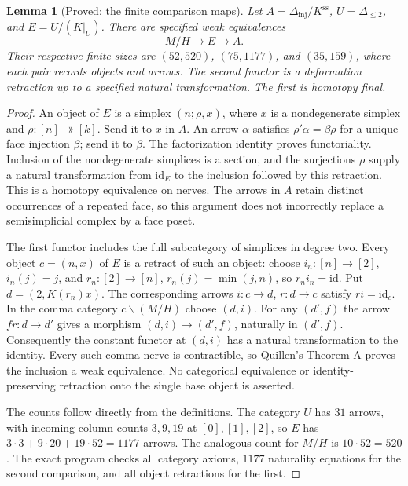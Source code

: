 \documentclass[11pt,a4paper]{article}
\newtheorem{lemma}[theorem]{Lemma}
\theoremstyle{definition}
\theoremstyle{remark}
\newcommand{\id}{\mathrm{id}}
\begin{document}
\begin{lemma}[Proved: the finite comparison maps]\label{A:comparisons}
Let $A=\Delta_{\mathrm{inj}}/K^{\mathrm{ss}}$, $U=\Delta_{\leq2}$, and $E=U/(K|_U)$. There are specified weak equivalences
\[
 M/H\longrightarrow E\longrightarrow A.
\]
Their respective finite sizes are $(52,520)$, $(75,1177)$, and $(35,159)$, where each pair records objects and arrows. The second functor is a deformation retraction up to a specified natural transformation. The first is homotopy final.
\end{lemma}
\begin{proof}
An object of $E$ is a simplex $(n;\rho,x)$, where $x$ is a nondegenerate simplex and $\rho:[n]\twoheadrightarrow[k]$. Send it to $x$ in $A$. An arrow $\alpha$ satisfies $\rho'\alpha=\beta\rho$ for a unique face injection $\beta$; send it to $\beta$. The factorization identity proves functoriality. Inclusion of the nondegenerate simplices is a section, and the surjections $\rho$ supply a natural transformation from $\id_E$ to the inclusion followed by this retraction. This is a homotopy equivalence on nerves. The arrows in $A$ retain distinct occurrences of a repeated face, so this argument does not incorrectly replace a semisimplicial complex by a face poset.

The first functor includes the full subcategory of simplices in degree two. Every object $c=(n,x)$ of $E$ is a retract of such an object: choose $i_n:[n]\to[2]$, $i_n(j)=j$, and $r_n:[2]\to[n]$, $r_n(j)=\min(j,n)$, so $r_n i_n=\id$. Put $d=(2,K(r_n)x)$. The corresponding arrows $i:c\to d$, $r:d\to c$ satisfy $ri=\id_c$. In the comma category $c\backslash(M/H)$ choose $(d,i)$. For any $(d',f)$ the arrow $fr:d\to d'$ gives a morphism $(d,i)\to(d',f)$, naturally in $(d',f)$. Consequently the constant functor at $(d,i)$ has a natural transformation to the identity. Every such comma nerve is contractible, so Quillen's Theorem A proves the inclusion a weak equivalence. No categorical equivalence or identity-preserving retraction onto the single base object is asserted.

The counts follow directly from the definitions. The category $U$ has $31$ arrows, with incoming column counts $3,9,19$ at $[0],[1],[2]$, so $E$ has $3\cdot3+9\cdot20+19\cdot52=1177$ arrows. The analogous count for $M/H$ is $10\cdot52=520$. The exact program checks all category axioms, $1177$ naturality equations for the second comparison, and all object retractions for the first.
\end{proof}
\end{document}
